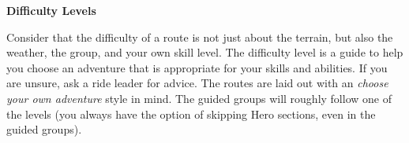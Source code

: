 \documentclass{article}
\begin{document}
\hfill%

\begin{minipage}[t]{0.9\linewidth}
    \textbf{Difficulty Levels}

    Consider that the difficulty of a route is not just about the terrain, but also the weather, the group, and your own skill level. The difficulty level is a guide to help you choose an adventure that is appropriate for your skills and abilities. If you are unsure, ask a ride leader for advice.
    \vspace{0.2em}
    The routes are laid out with an \textit{choose your own adventure} style in mind. The guided groups will roughly follow one of the levels (you always have the option of skipping Hero sections, even in the guided groups).
    \vspace{0.5em}


\end{minipage}
\end{document}

